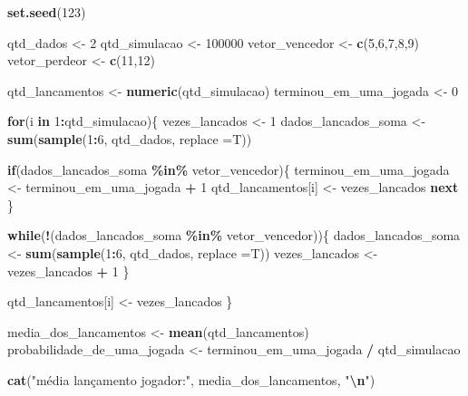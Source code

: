 \documentclass[
]{article}
\newenvironment{Shaded}{\begin{snugshade}}{\end{snugshade}}
\newcommand{\AttributeTok}[1]{\textcolor[rgb]{0.13,0.29,0.53}{#1}}
\newcommand{\ControlFlowTok}[1]{\textcolor[rgb]{0.13,0.29,0.53}{\textbf{#1}}}
\newcommand{\DecValTok}[1]{\textcolor[rgb]{0.00,0.00,0.81}{#1}}
\newcommand{\FunctionTok}[1]{\textcolor[rgb]{0.13,0.29,0.53}{\textbf{#1}}}
\newcommand{\NormalTok}[1]{#1}
\newcommand{\OtherTok}[1]{\textcolor[rgb]{0.56,0.35,0.01}{#1}}
\newcommand{\SpecialCharTok}[1]{\textcolor[rgb]{0.81,0.36,0.00}{\textbf{#1}}}
\newcommand{\StringTok}[1]{\textcolor[rgb]{0.31,0.60,0.02}{#1}}
\begin{document}
\begin{Shaded}
\begin{Highlighting}[]
\FunctionTok{set.seed}\NormalTok{(}\DecValTok{123}\NormalTok{) }

\NormalTok{qtd\_dados }\OtherTok{\textless{}{-}} \DecValTok{2}
\NormalTok{qtd\_simulacao }\OtherTok{\textless{}{-}} \DecValTok{100000} 
\NormalTok{vetor\_vencedor }\OtherTok{\textless{}{-}} \FunctionTok{c}\NormalTok{(}\DecValTok{5}\NormalTok{,}\DecValTok{6}\NormalTok{,}\DecValTok{7}\NormalTok{,}\DecValTok{8}\NormalTok{,}\DecValTok{9}\NormalTok{)}
\NormalTok{vetor\_perdeor }\OtherTok{\textless{}{-}} \FunctionTok{c}\NormalTok{(}\DecValTok{11}\NormalTok{,}\DecValTok{12}\NormalTok{)}

\NormalTok{qtd\_lancamentos }\OtherTok{\textless{}{-}} \FunctionTok{numeric}\NormalTok{(qtd\_simulacao)}
\NormalTok{terminou\_em\_uma\_jogada }\OtherTok{\textless{}{-}} \DecValTok{0}

\ControlFlowTok{for}\NormalTok{(i }\ControlFlowTok{in} \DecValTok{1}\SpecialCharTok{:}\NormalTok{qtd\_simulacao)\{}
\NormalTok{    vezes\_lancados }\OtherTok{\textless{}{-}} \DecValTok{1}
\NormalTok{    dados\_lancados\_soma }\OtherTok{\textless{}{-}} \FunctionTok{sum}\NormalTok{(}\FunctionTok{sample}\NormalTok{(}\DecValTok{1}\SpecialCharTok{:}\DecValTok{6}\NormalTok{, qtd\_dados, }\AttributeTok{replace =}\NormalTok{T))}

    \ControlFlowTok{if}\NormalTok{(dados\_lancados\_soma }\SpecialCharTok{\%in\%}\NormalTok{ vetor\_vencedor)\{}
\NormalTok{        terminou\_em\_uma\_jogada }\OtherTok{\textless{}{-}}\NormalTok{ terminou\_em\_uma\_jogada }\SpecialCharTok{+} \DecValTok{1}
\NormalTok{        qtd\_lancamentos[i] }\OtherTok{\textless{}{-}}\NormalTok{ vezes\_lancados}
        \ControlFlowTok{next}
\NormalTok{    \}}
    
    \ControlFlowTok{while}\NormalTok{(}\SpecialCharTok{!}\NormalTok{(dados\_lancados\_soma }\SpecialCharTok{\%in\%}\NormalTok{ vetor\_vencedor))\{}
\NormalTok{        dados\_lancados\_soma }\OtherTok{\textless{}{-}} \FunctionTok{sum}\NormalTok{(}\FunctionTok{sample}\NormalTok{(}\DecValTok{1}\SpecialCharTok{:}\DecValTok{6}\NormalTok{, qtd\_dados, }\AttributeTok{replace =}\NormalTok{T))}
\NormalTok{        vezes\_lancados }\OtherTok{\textless{}{-}}\NormalTok{ vezes\_lancados }\SpecialCharTok{+} \DecValTok{1}
\NormalTok{    \}}

\NormalTok{    qtd\_lancamentos[i] }\OtherTok{\textless{}{-}}\NormalTok{ vezes\_lancados}
\NormalTok{\}}

\NormalTok{media\_dos\_lancamentos }\OtherTok{\textless{}{-}} \FunctionTok{mean}\NormalTok{(qtd\_lancamentos)}
\NormalTok{probabilidade\_de\_uma\_jogada }\OtherTok{\textless{}{-}}\NormalTok{ terminou\_em\_uma\_jogada }\SpecialCharTok{/}\NormalTok{ qtd\_simulacao}

\FunctionTok{cat}\NormalTok{(}\StringTok{"média lançamento jogador:"}\NormalTok{, media\_dos\_lancamentos, }\StringTok{"}\SpecialCharTok{\textbackslash{}n}\StringTok{"}\NormalTok{)}
\end{Highlighting}
\end{Shaded}
\end{document}
